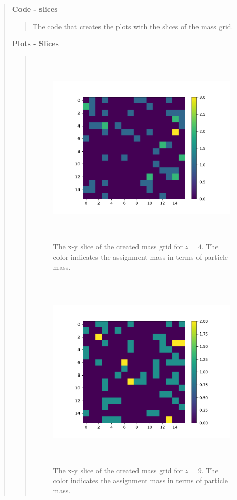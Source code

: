 \begin{quote}
\newpage
\textbf{Code - slices}
\begin{quote}
The code that creates the plots with the slices of the mass grid.

\end{quote}

\textbf{Plots - Slices}
\begin{quote}
\begin{figure}[!ht]
\centering
\includegraphics[width=14cm, height=9.5cm]{./Plots/5a_slice_4.pdf}
\caption{The x-y slice of the created mass grid for $z = 4$. The color indicates the assignment mass in terms of particle mass. }
\end{figure}
\newpage

\begin{figure}[!ht]
\centering
\includegraphics[width=14cm, height=9.5cm]{./Plots/5a_slice_9.pdf}
\caption{The x-y slice of the created mass grid for $z = 9$. The color indicates the assignment mass in terms of particle mass. }
\end{figure}


\end{quote}
\end{quote}
